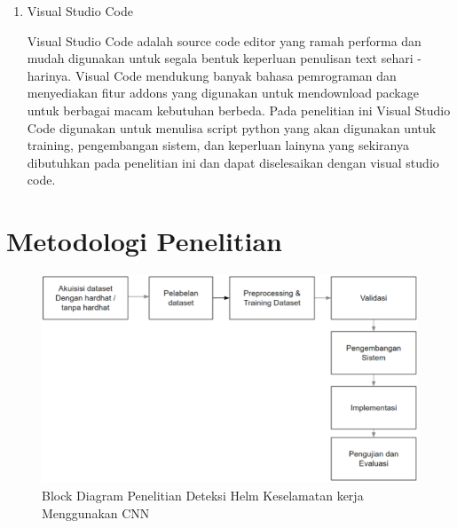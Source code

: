 \begin{enumerate}
\begin{enumerate}
    \item Visual Studio Code
    \par Visual Studio Code adalah source code editor yang ramah performa dan mudah digunakan untuk segala bentuk keperluan penulisan text sehari - harinya. Visual Code mendukung banyak bahasa pemrograman dan menyediakan fitur addons yang digunakan untuk mendownload package untuk berbagai macam kebutuhan berbeda. Pada penelitian ini Visual Studio Code digunakan untuk menulisa script python yang akan digunakan untuk training, pengembangan sistem, dan keperluan lainyna yang sekiranya dibutuhkan pada penelitian ini dan dapat diselesaikan dengan visual studio code.\cite{microsoft_2021}

  \end{enumerate}


\end{enumerate}



\section{Metodologi Penelitian}
\label{metodologipenelitian}

\begin{figure}[ht]
  \centering
  \includegraphics[scale=0.4]{gambar/blockdiagram-helmetdetection.png}
  \caption{Block Diagram Penelitian Deteksi Helm Keselamatan kerja Menggunakan CNN}
  \label{fig:blockdiagramhelmetdetection}  
\end{figure}


